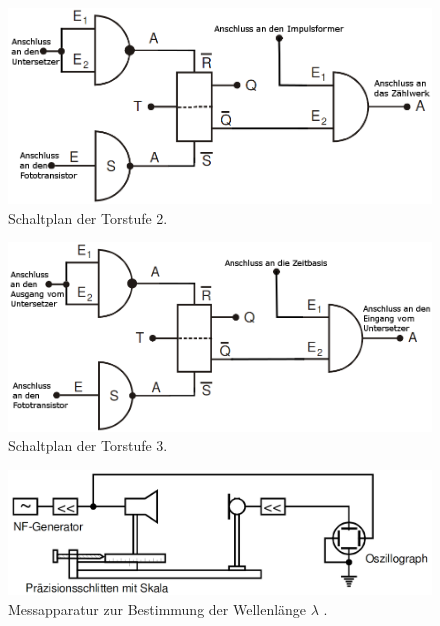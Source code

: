 \begin{figure}
	\centering
	\includegraphics[width=\linewidth-50pt,height=\textheight-50pt,keepaspectratio]{content/Bilder/Torstufe2.png}
	\caption{Schaltplan der Torstufe 2.}
	\label{fig:Aufbau77}
\end{figure}
\begin{figure}
	\centering
	\includegraphics[width=\linewidth-50pt,height=\textheight-50pt,keepaspectratio]{content/Bilder/Torstufe3.png}
	\caption{Schaltplan der Torstufe 3.}
	\label{fig:Aufbau-47}
\end{figure}
\begin{figure}
	\centering
	\includegraphics[width=\linewidth-50pt,height=\textheight-50pt,keepaspectratio]{content/Bilder/Lambda.png}
	\caption{Messapparatur zur Bestimmung der Wellenlänge $\lambda$ \cite{V104}.}
	\label{fig:lamb}
\end{figure}

